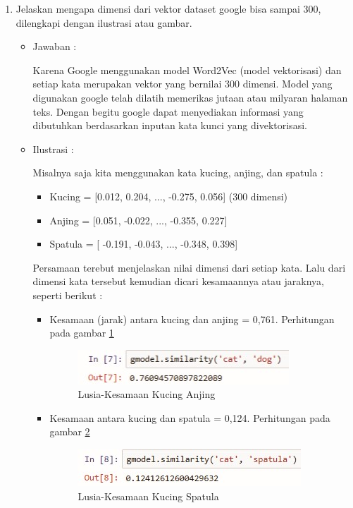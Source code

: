 \begin{enumerate}
\item Jelaskan mengapa dimensi dari vektor dataset google bisa sampai 300, dilengkapi
dengan ilustrasi atau gambar.
	\begin{itemize}
	\item Jawaban :
		\par Karena Google menggunakan model Word2Vec (model vektorisasi) dan setiap kata merupakan vektor yang bernilai 300 dimensi. Model yang digunakan google telah dilatih memerikas jutaan atau milyaran halaman teks. Dengan begitu google dapat menyediakan informasi yang dibutuhkan berdasarkan inputan kata kunci yang divektorisasi.
	\item Ilustrasi :
		\par Misalnya saja kita menggunakan kata kucing, anjing, dan spatula :
	
	\begin{itemize}
	\item Kucing = [0.012, 0.204, ..., -0.275, 0.056] (300 dimensi)
	\item Anjing = [0.051, -0.022, ..., -0.355, 0.227]
	\item Spatula = [ -0.191, -0.043, ..., -0.348, 0.398]
	\end{itemize}
	
	\par Persamaan terebut menjelaskan nilai dimensi dari setiap kata. Lalu dari dimensi kata tersebut kemudian dicari kesamaannya atau jaraknya, seperti berikut :	
	
	\begin{itemize}
	\item Kesamaan (jarak) antara kucing dan anjing = 0,761. Perhitungan pada gambar \ref{5a2}
		\begin{figure}[ht]
		\centering
		\includegraphics[scale=0.5]{figures/p2a.jpg}
		\caption{Lusia-Kesamaan Kucing Anjing}
		\label{5a2}
		\end{figure}
	\item Kesamaan antara kucing dan spatula = 0,124. Perhitungan pada gambar  \ref{5a3}
		\begin{figure}[ht]
		\centering
		\includegraphics[scale=0.5]{figures/p2b.jpg}
		\caption{Lusia-Kesamaan Kucing Spatula}
		\label{5a3}
		\end{figure}
	\end{itemize}
	

\end{itemize}
\end{enumerate}
